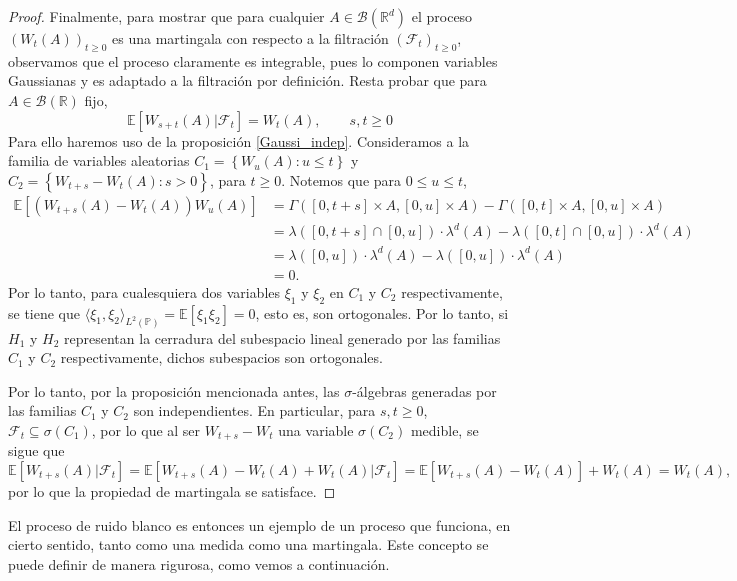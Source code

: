 \documentclass[letterpaper,twoside,12pt]{book}
\newcommand{\R}{\mathbb{R}}
\newcommand{\F}{\mathcal{F}}
\newcommand{\B}{\mathcal{B}}
\newcommand{\E}{\mathbb{E}}
\renewcommand{\P}{\mathbb{P}}
\newcommand{\1}{\mathds{1}}
\theoremstyle{definition}
\theoremstyle{definition}
\theoremstyle{remark}
\theoremstyle{definition}
\theoremstyle{definition}
\theoremstyle{definition}
\theoremstyle{definition}
\theoremstyle{definition}
\begin{document}
\begin{proof}
 Finalmente, para mostrar que para cualquier $A\in \B(\R^{d})$ el proceso $(W_t(A))_{t\geq0}$ es una martingala con respecto a la filtración $(\F_t)_{t\geq0}$, observamos que el proceso claramente es integrable, pues lo componen variables Gaussianas y es adaptado a la filtración por definición. Resta probar que para $A\in \B(\R)$ fijo,
 \[
 \E\left[W_{s+t}(A)\lvert \F_t\right]=W_t(A), \qquad s,t\geq0  
 \]
 Para ello haremos uso de la proposición \ref{Gaussi_indep}. Consideramos a la familia de variables aleatorias $C_1=\left\{W_u(A):u\leq t\right\}$ y
 $C_2=\left\{W_{t+s}-W_t(A):s>0 \right\}$, para $t\geq0$. Notemos que para $0\le u\le t$,
 \begin{align*}
   \E\left[(W_{t+s}(A)-W_t(A))W_u(A)\right]&=\Gamma([0,t+s]\times A, [0,u]\times A)-\Gamma([0,t]\times A,[0,u]\times A)\\
   &=\lambda([0,t+s]\cap[0,u])\cdot\lambda^{d}(A)-\lambda([0,t]\cap[0,u])\cdot\lambda^{d}(A)\\
   &=\lambda([0,u])\cdot\lambda^{d}(A)-\lambda([0,u])\cdot\lambda^{d}(A)\\
   &=0.
 \end{align*}
 Por lo tanto, para cualesquiera dos variables $\xi_1$ y $\xi_2$ en $C_1$ y $C_2$ respectivamente, se tiene que $\langle \xi_1,\xi_2\rangle_{L^2(\P)}= \E\left[\xi_1\xi_2\right]=0$, esto es, son ortogonales. Por lo tanto, si $H_1$ y $H_2$ representan la cerradura del subespacio lineal generado por las familias $C_1$ y $C_2$ respectivamente, dichos subespacios son ortogonales.
 
 Por lo tanto, por la proposición mencionada antes, las $\sigma$-álgebras generadas por las familias $C_1$ y $C_2$ son independientes. En particular, para $s,t\geq0$, $\F_t\subseteq \sigma(C_1)$, por lo que al ser $W_{t+s}-W_t$ una variable $\sigma(C_2)$ medible, se sigue que 
 \[
     \E\left[W_{t+s}(A)|\F_t\right]=\E\left[W_{t+s}(A)-W_{t}(A)+W_t(A)|\F_t\right]=\E\left[W_{t+s}(A)-W_t(A)\right]+W_t(A)=W_t(A),
     \]
     por lo que la propiedad de martingala se satisface.  
\end{proof}

El proceso de ruido blanco es entonces un ejemplo de un proceso que funciona, en cierto sentido, tanto como una medida como una martingala. Este concepto se puede definir de manera rigurosa, como vemos a continuación.
\end{document}
